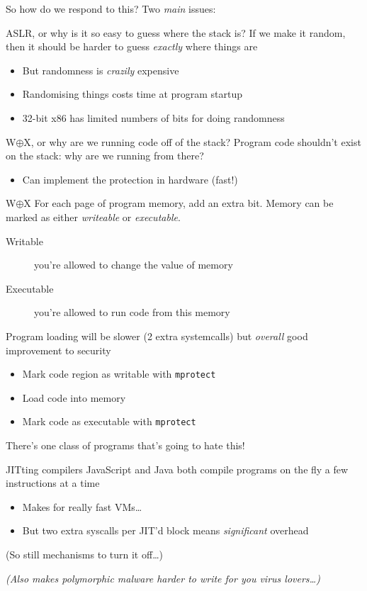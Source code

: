 \documentclass[9pt,aspectratio=169]{beamer}
\begin{document}
\begin{frame}[label={sec:org485f322}]{So how do we respond to this?}
Two \emph{main} issues:
\begin{block}{ASLR, or why is it so easy to guess where the stack is?}
If we make it random, then it should be harder to guess \emph{exactly} where things are
\begin{itemize}
\item But randomness is \emph{crazily} expensive
\item Randomising things costs time at program startup
\item 32-bit x86 has limited numbers of bits for doing randomness
\end{itemize}
\end{block}
\begin{block}{W\(\oplus\)X, or why are we running code off of the stack?}
Program code shouldn't exist on the stack: why are we running from there?
\begin{itemize}
\item Can implement the protection in hardware (fast!)
\end{itemize}
\end{block}
\end{frame}
\begin{frame}[label={sec:org197d958},fragile]{W\(\oplus\)X}
 For each page of program memory, add an extra bit.
Memory can be marked as either \emph{writeable} or \emph{executable}.

\begin{description}
\item[{Writable}] you're allowed to change the value of memory
\item[{Executable}] you're allowed to run code from this memory
\end{description}

Program loading will be slower (2 extra systemcalls) but  \emph{overall} good improvement to security
\begin{itemize}
\item Mark code region as writable with \texttt{mprotect}
\item Load code into memory
\item Mark code as executable with \texttt{mprotect}
\end{itemize}
\begin{block}{There's one class of programs that's going to hate this!}
\end{block}
\end{frame}
\begin{frame}[label={sec:orgdd272ba}]{JITting compilers}
JavaScript and Java both compile programs on the fly a few instructions at a time
\begin{itemize}
\item Makes for really fast VMs\ldots{}
\item But two extra syscalls per JIT'd block means \emph{significant} overhead
\end{itemize}

(So still mechanisms to turn it off\ldots{})

\vfill
\footnotesize
\emph{(Also makes polymorphic malware harder to write for you virus lovers\ldots{})}
\end{frame}
\end{document}
